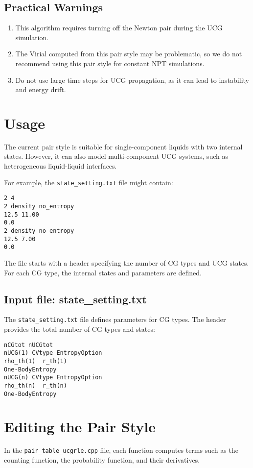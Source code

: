 \documentclass{article}
\begin{document}
\subsection{Practical Warnings}
\begin{enumerate}
    \item This algorithm requires turning off the Newton pair during the UCG simulation.
    \item The Virial computed from this pair style may be problematic, so we do not recommend using this pair style for constant NPT simulations.
    \item Do not use large time steps for UCG propagation, as it can lead to instability and energy drift.
\end{enumerate}

\section{Usage}
The current pair style is suitable for single-component liquids with two internal states. However, it can also model multi-component UCG systems, such as heterogeneous liquid-liquid interfaces.

For example, the \texttt{state\_setting.txt} file might contain:

\begin{verbatim}
2 4
2 density no_entropy
12.5 11.00
0.0
2 density no_entropy
12.5 7.00
0.0
\end{verbatim}

The file starts with a header specifying the number of CG types and UCG states. For each CG type, the internal states and parameters are defined.

\subsection{Input file: state\_setting.txt}
The \texttt{state\_setting.txt} file defines parameters for CG types. The header provides the total number of CG types and states:
\begin{verbatim}
nCGtot nUCGtot
nUCG(1) CVtype EntropyOption
rho_th(1)  r_th(1)
One-BodyEntropy
nUCG(n) CVtype EntropyOption
rho_th(n)  r_th(n)
One-BodyEntropy
\end{verbatim}

\section{Editing the Pair Style}
In the \texttt{pair\_table\_ucgrle.cpp} file, each function computes terms such as the counting function, the probability function, and their derivatives.
\end{document}
